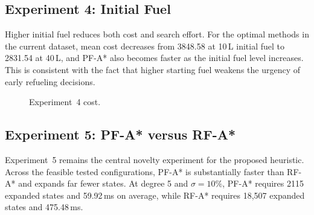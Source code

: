 \subsection*{Experiment 4: Initial Fuel}

Higher initial fuel reduces both cost and search effort.
For the optimal methods in the current dataset, mean cost decreases from 3848.58 at 10\,L
initial fuel to 2831.54 at 40\,L, and PF-A* also becomes faster as the initial fuel level
increases.
This is consistent with the fact that higher starting fuel weakens the urgency of early
refueling decisions.

\begin{figure}[H]
      \centering
      \caption{Experiment~4 cost.}
      \label{fig:final_exp4_cost}
\end{figure}

\subsection*{Experiment 5: PF-A* versus RF-A*}

Experiment~5 remains the central novelty experiment for the proposed heuristic.
Across the feasible tested configurations, PF-A* is substantially faster than RF-A* and expands
far fewer states.
At degree 5 and $\sigma=10\%$, PF-A* requires 2115 expanded states and 59.92\,ms on average,
while RF-A* requires 18,507 expanded states and 475.48\,ms.

